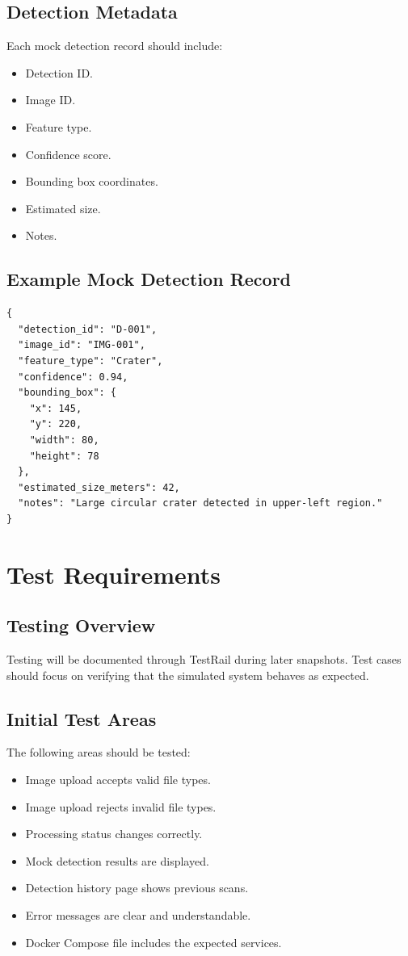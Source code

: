 \documentclass[12pt]{article}
\begin{document}
\subsection{Detection Metadata}

Each mock detection record should include:

\begin{itemize}
    \item Detection ID.
    \item Image ID.
    \item Feature type.
    \item Confidence score.
    \item Bounding box coordinates.
    \item Estimated size.
    \item Notes.
\end{itemize}

\subsection{Example Mock Detection Record}

\begin{verbatim}
{
  "detection_id": "D-001",
  "image_id": "IMG-001",
  "feature_type": "Crater",
  "confidence": 0.94,
  "bounding_box": {
    "x": 145,
    "y": 220,
    "width": 80,
    "height": 78
  },
  "estimated_size_meters": 42,
  "notes": "Large circular crater detected in upper-left region."
}
\end{verbatim}

\section{Test Requirements}

\subsection{Testing Overview}

Testing will be documented through TestRail during later snapshots. Test cases should focus on verifying that the simulated system behaves as expected.

\subsection{Initial Test Areas}

The following areas should be tested:

\begin{itemize}
    \item Image upload accepts valid file types.
    \item Image upload rejects invalid file types.
    \item Processing status changes correctly.
    \item Mock detection results are displayed.
    \item Detection history page shows previous scans.
    \item Error messages are clear and understandable.
    \item Docker Compose file includes the expected services.
\end{itemize}
\end{document}
